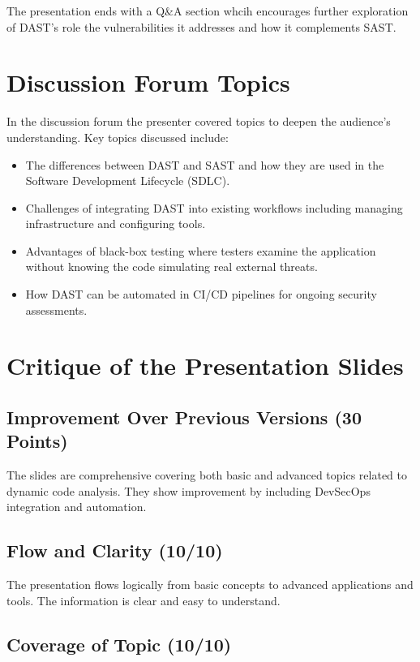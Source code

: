 \documentclass{article}
\begin{document}
The presentation ends with a Q\&A section whcih encourages further exploration of DAST's role the vulnerabilities it addresses and how it complements SAST.

\section*{Discussion Forum Topics}

In the discussion forum the presenter covered topics to deepen the audience's understanding. Key topics discussed include:

\begin{itemize}
    \item The differences between DAST and SAST and how they are used in the Software Development Lifecycle (SDLC).
    \item Challenges of integrating DAST into existing workflows including managing infrastructure and configuring tools.
    \item Advantages of black-box testing where testers examine the application without knowing the code simulating real external threats.
    \item How DAST can be automated in CI/CD pipelines for ongoing security assessments.
\end{itemize}

\section*{Critique of the Presentation Slides}

\subsection*{Improvement Over Previous Versions (30 Points)}

The slides are comprehensive covering both basic and advanced topics related to dynamic code analysis. They show improvement by including DevSecOps integration and automation.

\subsection*{Flow and Clarity (10/10)}

The presentation flows logically from basic concepts to advanced applications and tools. The information is clear and easy to understand.

\subsection*{Coverage of Topic (10/10)}
\end{document}
